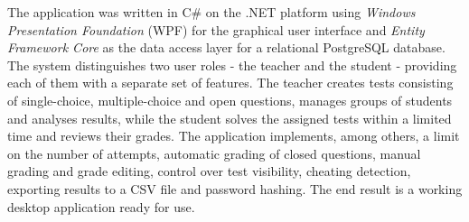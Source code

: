 The application was written in C\# on the .NET platform using \emph{Windows Presentation
Foundation} (WPF) for the graphical user interface and \emph{Entity Framework Core} as the data
access layer for a relational PostgreSQL database. The system distinguishes two user roles - the
teacher and the student - providing each of them with a separate set of features. The teacher
creates tests consisting of single-choice, multiple-choice and open questions, manages groups of
students and analyses results, while the student solves the assigned tests within a limited time
and reviews their grades. The application implements, among others, a limit on the number of
attempts, automatic grading of closed questions, manual grading and grade editing, control over test
visibility, cheating detection, exporting results to a CSV file and password hashing. The end result
is a working desktop application ready for use.
